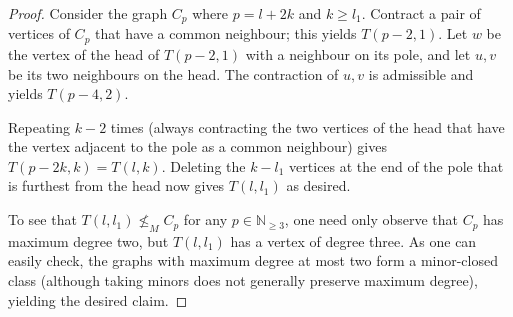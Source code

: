 \documentclass[10pt,a4paper]{amsart}
\theoremstyle{plain}
\theoremstyle{definition}
\theoremstyle{remark}
\newcommand{\minorOf}{\leq_{M}}
\newcommand{\IN}{\mathbb{N}}
\newcommand{\therese}[1]{}\newcommand{\dinis}[1]{}
\begin{document}
\begin{proof}
    Consider the graph $C_p$ where $p=l+2k$ and $k\geq l_1$.
    Contract a pair of vertices of $C_p$ that have a common neighbour;
    this yields $T(p-2,1)$.
    Let $w$ be the vertex of the head of $T(p-2,1)$ with a neighbour on its pole, and let $u,v$ be its two neighbours on the head.
    The contraction of $u,v$ is admissible and yields $T(p-4,2)$.
    \therese{switched $v$ and $w$ here to match how we defined contractions earlier}
    Repeating $k-2$ times (always contracting the two vertices of the head that have the vertex adjacent to the pole as a common neighbour) gives $T(p-2k,k)=T(l,k)$.
    Deleting the $k-l_1$ vertices at the end of the pole that is furthest from the head now gives $T(l,l_1)$ as desired.

    To see that $T(l,l_1)\not\minorOf C_{p}$ for any $p\in\IN_{\geq 3}$, one need only observe that $C_p$ has maximum degree two, but $T(l,l_1)$ has a vertex of degree three.
    As one can easily check, the graphs with maximum degree at most two form a minor-closed class (although taking minors does not generally preserve maximum degree), yielding the desired claim.
    \dinis{I reworded a bit here (see discussion/commented out things above)}
    \therese{I don't see any rewording except the `subquadratic', but I think what's here is fine.}
    \therese{I had not heard the term `subquadratic graph' before, and would have guessed that this means `has asymptotically fewer than $n^2$ edges'.  Let's not use this term.  (Or if you really love it, define it.)}
    \dinis{Fair.
    I'm not sure the term subquadratic exists anywhere else.
    I mostly wanted to avoid using the words maximum degree and minor-closed to prevent people from thinking that any upper bound on max degree is preserved by taking minors (which is obviously false)}
\end{proof}
\end{document}

